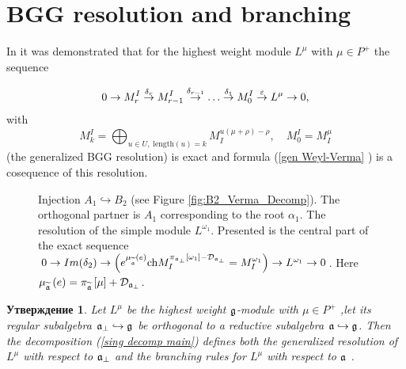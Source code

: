 \documentclass[12pt]{article}
\newtheorem{statement}{Утверждение}
\theoremstyle{definition}
\newcommand{\aft}{\widetilde{\mathfrak{a}}}
\newcommand{\afb}{\mathfrak{a}_{\bot}}
\begin{document}
\section{BGG resolution and branching}

In \cite{lepowsky1977generalization} it was demonstrated that for the
highest weight module $L^{\mu }$ with $\mu \in P^{+}$ the sequence

\begin{equation}
0\rightarrow M_{r}^{I}\overset{\delta _{r}}{\rightarrow }M_{r-1}^{I}\overset{%
\delta _{r-1}}{\rightarrow }\ldots \overset{\delta _{1}}{\rightarrow }%
M_{0}^{I}\overset{\varepsilon }{\rightarrow }L^{\mu }\rightarrow 0,
\label{resolution sequence}
\end{equation}
with
\begin{equation}
M_{k}^{I}=\bigoplus_{u\in U,\;\mathrm{length}\left( u\right)
=k}M_{I}^{u\left( \mu +\rho \right) -\rho },\quad M_{0}^{I}=M_{I}^{\mu }
\label{Verma elements sequence}
\end{equation}
(the generalized BGG resolution) is exact and formula (\ref{gen Weyl-Verma}%
) is a cosequence of this resolution.

\begin{figure}[h!bt]
 \noindent{}
 \caption{Injection $A_1\hookrightarrow B_2$ (see Figure \ref{fig:B2_Verma_Decomp}).
 The orthogonal partner is $A_1$ corresponding to the root $\alpha_1$.
 The resolution of the simple module $L^{\omega_1}$.
 Presented is the central part of the exact sequence
   $0 \to Im(\delta_2) \to \left( e^{\mu _{\widetilde{%
\frak{a}}}\left( e\right) }\mathrm{ch}M_{I}^{\pi _{\afb}\left[ \omega_1 \right] -%
\mathcal{D}_{\afb} }=M^{\omega_1}_{I}\right) \to
   L^{\omega_1}\to 0 $.  Here $\mu _{\widetilde{\frak{a}}}\left( e\right) =\pi _{\aft}\left[ \mu \right] + \mathcal{D}_{\afb}$.
   }
\end{figure}


\begin{statement}

Let $L^{\mu }$ be the highest weight $\frak{g}$-module with $\mu \in P^{+}$
,let its regular subalgebra $\mathfrak{a}_{\bot }\hookrightarrow \frak{g}$
be orthogonal to a reductive subalgebra $\frak{a}\hookrightarrow \frak{g}$.
Then the decomposition (\ref{sing decomp main}) defines both the generalized
resolution of $L^{\mu }$ with respect to $\frak{a}_{\perp }$ and the
branching rules for $L^{\mu }$ with respect to $\frak{a}$ .
\end{statement}
\end{document}
